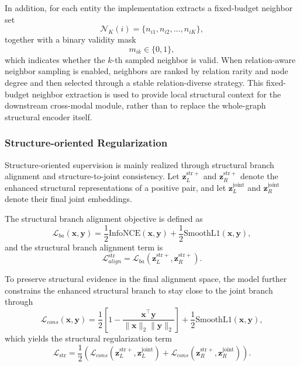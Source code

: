 In addition, for each entity the implementation extracts a fixed-budget neighbor set
\[
\mathcal{N}_{K}(i)=\{n_{i1},n_{i2},\dots,n_{iK}\},
\]
together with a binary validity mask
\[
m_{ik}\in\{0,1\},
\]
which indicates whether the $k$-th sampled neighbor is valid. When relation-aware neighbor sampling is enabled, neighbors are ranked by relation rarity and node degree and then selected through a stable relation-diverse strategy. This fixed-budget neighbor extraction is used to provide local structural context for the downstream cross-modal module, rather than to replace the whole-graph structural encoder itself.

\subsubsection{Structure-oriented Regularization}

Structure-oriented supervision is mainly realized through structural branch alignment and structure-to-joint consistency. Let $\mathbf{z}_{L}^{\mathrm{str}+}$ and $\mathbf{z}_{R}^{\mathrm{str}+}$ denote the enhanced structural representations of a positive pair, and let $\mathbf{z}_{L}^{\mathrm{joint}}$ and $\mathbf{z}_{R}^{\mathrm{joint}}$ denote their final joint embeddings.

The structural branch alignment objective is defined as
\begin{equation}
\mathcal{L}_{ba}(\mathbf{x},\mathbf{y})
=
\frac{1}{2}\mathrm{InfoNCE}(\mathbf{x},\mathbf{y})
+
\frac{1}{2}\mathrm{SmoothL1}(\mathbf{x},\mathbf{y}),
\end{equation}
and the structural branch alignment term is
\begin{equation}
\mathcal{L}_{align}^{\mathrm{str}}
=
\mathcal{L}_{ba}(\mathbf{z}_{L}^{\mathrm{str}+}, \mathbf{z}_{R}^{\mathrm{str}+}).
\end{equation}

To preserve structural evidence in the final alignment space, the model further constrains the enhanced structural branch to stay close to the joint branch through
\begin{equation}
\mathcal{L}_{cons}(\mathbf{x},\mathbf{y})
=
\frac{1}{2}
\left[
1-\frac{\mathbf{x}^{\top}\mathbf{y}}{\|\mathbf{x}\|_2\|\mathbf{y}\|_2}
\right]
+
\frac{1}{2}\mathrm{SmoothL1}(\mathbf{x},\mathbf{y}),
\end{equation}
which yields the structural regularization term
\begin{equation}
\mathcal{L}_{\mathrm{str}}
=
\frac{1}{2}
\left(
\mathcal{L}_{cons}(\mathbf{z}_{L}^{\mathrm{str}+},\mathbf{z}_{L}^{\mathrm{joint}})
+
\mathcal{L}_{cons}(\mathbf{z}_{R}^{\mathrm{str}+},\mathbf{z}_{R}^{\mathrm{joint}})
\right).
\end{equation}

